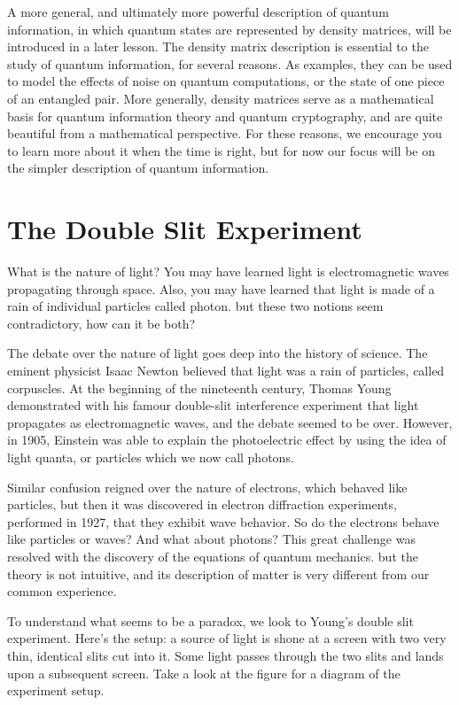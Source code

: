 A more general, and ultimately more powerful description of quantum information, in which quantum states are represented by density matrices, will be introduced in a later lesson. The density matrix description is essential to the study of quantum information, for several reasons. As examples, they can be used to model the effects of noise on quantum computations, or the state of one piece of an entangled pair. More generally, density matrices serve as a mathematical basis for quantum information theory and quantum cryptography, and are quite beautiful from a mathematical perspective. For these reasons, we encourage you to learn more about it when the time is right, but for now our focus will be on the simpler description of quantum information.
\section{The Double Slit Experiment}
What is the nature of light? You may have learned light is electromagnetic waves propagating through space. Also, you may have learned that light is made of a rain of individual particles called photon. but these two notions seem contradictory, how can it be both?

The debate over the nature of light goes deep into the history of science. The eminent physicist Isaac Newton believed that light was a rain of particles, called corpuscles. At the beginning of the nineteenth century, Thomas Young demonstrated with his famour double-slit interference experiment that light propagates as electromagnetic waves, and the debate seemed to be over. However, in 1905, Einstein was able to explain the photoelectric effect by using the idea of light quanta, or particles which we now call photons.

Similar confusion reigned over the nature of electrons, which behaved like particles, but then it was discovered in electron diffraction experiments, performed in 1927, that they exhibit wave behavior. So do the electrons behave like particles or waves? And what about photons? This great challenge was resolved with the discovery of the equations of quantum mechanics. but the theory is not intuitive, and its description of matter is very different from our common experience.

To understand what seems to be a paradox, we look to Young's double slit experiment. Here's the setup: a source of light is shone at a screen with two very thin, identical slits cut into it. Some light passes through the two slits and lands upon a subsequent screen. Take a look at the figure for a diagram of the experiment setup.

